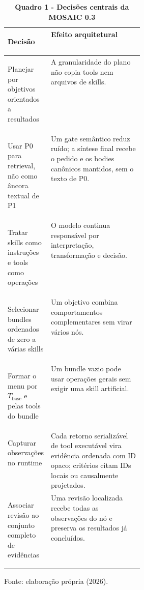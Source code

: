 \begin{table}[H]
\centering
\caption*{\textbf{Quadro 1 - Decisões centrais da MOSAIC 0.3}}
\small
\renewcommand{\arraystretch}{1.18}
\begin{tabularx}{\linewidth}{|>{\bfseries\raggedright\arraybackslash}p{0.31\linewidth}|Y|}
\hline
Decisão & Efeito arquitetural \\
\hline
Planejar por objetivos orientados a resultados &
A granularidade do plano não copia tools nem arquivos de skills. \\
\hline
Usar P0 para retrieval, não como âncora textual de P1 &
Um gate semântico reduz ruído; a síntese final recebe o pedido e os bodies
canônicos mantidos, sem o texto de P0. \\
\hline
Tratar skills como instruções e tools como operações &
O modelo continua responsável por interpretação, transformação e decisão. \\
\hline
Selecionar bundles ordenados de zero a várias skills &
Um objetivo combina comportamentos complementares sem virar vários nós. \\
\hline
Formar o menu por \(T_{\mathrm{base}}\) e pelas tools do bundle &
Um bundle vazio pode usar operações gerais sem exigir uma skill artificial. \\
\hline
Capturar observações no runtime &
Cada retorno serializável de tool executável vira evidência ordenada com ID opaco;
critérios citam IDs locais ou causalmente projetados. \\
\hline
Associar revisão ao conjunto completo de evidências &
Uma revisão localizada recebe todas as observações do nó e preserva os
resultados já concluídos. \\
\hline
\end{tabularx}
\par\smallskip\raggedright\small Fonte: elaboração própria (2026).
\end{table}
